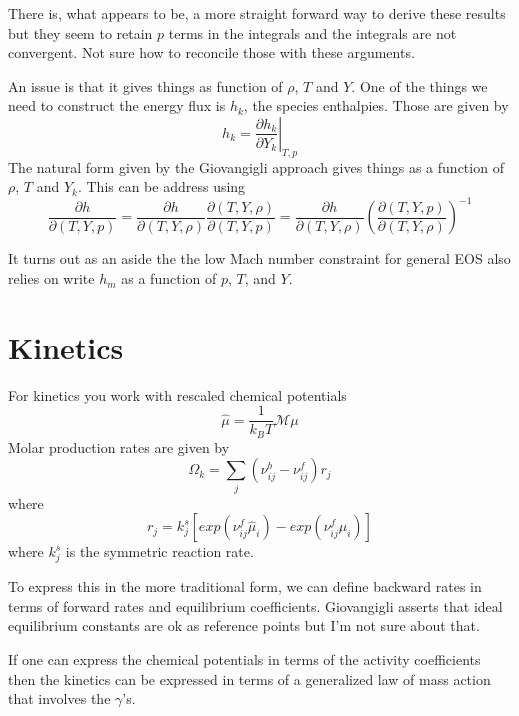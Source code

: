 \documentclass[11pt]{article}
\begin{document}
There is, what appears to be, a more straight forward way to derive these results
but they seem to retain $p$ terms in the integrals
and the integrals are not convergent. Not sure how to reconcile those with these arguments.

%
%
%
An issue is that it gives things as function of $\rho$, $T$ and $Y$.  One of the
things we need to construct the energy flux is $h_k$, the species enthalpies.
Those are given by 
\[
h_k = \left. \frac{\partial h_k}{\partial Y_k} \right|_{T,p}
\]
The natural form given by the Giovangigli approach gives things as a function of $\rho$, $T$ and $Y_k$.
This can be address using
\[
\frac{\partial h}{\partial (T,Y,p)}
= \frac{\partial h}{\partial (T,Y,\rho)}
\frac{\partial (T,Y,\rho)}{\partial (T,Y,p)}
= \frac{\partial h}{\partial (T,Y,\rho)}
\left (\frac{\partial (T,Y,p)}{\partial (T,Y,\rho)} \right)^{-1}
\]

It turns out as an aside the the low Mach number constraint for general EOS also relies on
write $h_m$ as a function of $p$, $T$, and $Y$.

\section{Kinetics}

For kinetics you work with rescaled chemical potentials
\[
\hat{\mu} = \frac{1}{k_B T} \mathcal{M} \mu
\]
Molar production rates are given by
\[
\Omega_k = \sum_j (\nu_{ij}^b - \nu_{ij}^f) r_j
\]
where 
\[
r_j = k_j^s \left [ exp(\nu_{ij}^f \hat{\mu}_i) - exp ( \nu_{ij}^f \hat{\mu}_i) \right ] 
\]
where $k_j^s$ is the symmetric reaction rate.

To express this in the more traditional form, we can define backward rates in terms of forward rates
and equilibrium coefficients.  Giovangigli asserts that ideal equilibrium constants are ok as 
reference points but I'm not sure about that.

If one can express the chemical potentials in terms of the activity coefficients then the 
kinetics can be expressed in terms of a generalized law of mass action that involves the $\gamma$'s.
\end{document}
